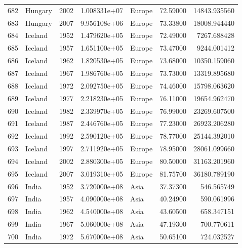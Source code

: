 \documentclass[
  letterpaper,
  DIV=11,
  numbers=noendperiod]{scrreprt}
\begin{document}
\begin{tabular}{llrrlrr}
682  &                   Hungary &  2002 &  1.008331e+07 &    Europe &  72.59000 &   14843.935560 \\
683  &                   Hungary &  2007 &  9.956108e+06 &    Europe &  73.33800 &   18008.944440 \\
684  &                   Iceland &  1952 &  1.479620e+05 &    Europe &  72.49000 &    7267.688428 \\
685  &                   Iceland &  1957 &  1.651100e+05 &    Europe &  73.47000 &    9244.001412 \\
686  &                   Iceland &  1962 &  1.820530e+05 &    Europe &  73.68000 &   10350.159060 \\
687  &                   Iceland &  1967 &  1.986760e+05 &    Europe &  73.73000 &   13319.895680 \\
688  &                   Iceland &  1972 &  2.092750e+05 &    Europe &  74.46000 &   15798.063620 \\
689  &                   Iceland &  1977 &  2.218230e+05 &    Europe &  76.11000 &   19654.962470 \\
690  &                   Iceland &  1982 &  2.339970e+05 &    Europe &  76.99000 &   23269.607500 \\
691  &                   Iceland &  1987 &  2.446760e+05 &    Europe &  77.23000 &   26923.206280 \\
692  &                   Iceland &  1992 &  2.590120e+05 &    Europe &  78.77000 &   25144.392010 \\
693  &                   Iceland &  1997 &  2.711920e+05 &    Europe &  78.95000 &   28061.099660 \\
694  &                   Iceland &  2002 &  2.880300e+05 &    Europe &  80.50000 &   31163.201960 \\
695  &                   Iceland &  2007 &  3.019310e+05 &    Europe &  81.75700 &   36180.789190 \\
696  &                     India &  1952 &  3.720000e+08 &      Asia &  37.37300 &     546.565749 \\
697  &                     India &  1957 &  4.090000e+08 &      Asia &  40.24900 &     590.061996 \\
698  &                     India &  1962 &  4.540000e+08 &      Asia &  43.60500 &     658.347151 \\
699  &                     India &  1967 &  5.060000e+08 &      Asia &  47.19300 &     700.770611 \\
700  &                     India &  1972 &  5.670000e+08 &      Asia &  50.65100 &     724.032527 \\

\end{tabular}
\end{document}
